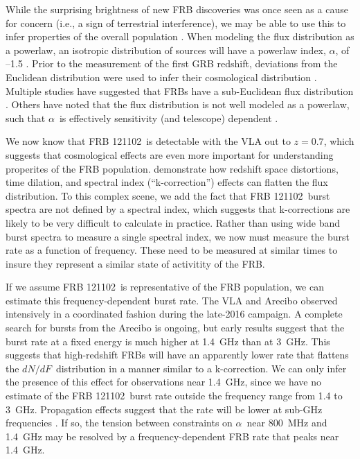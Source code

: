 \documentclass[twocolumn]{aastex61}
\newcommand{\frb}{FRB 121102}
\begin{document}
While the surprising brightness of new FRB discoveries was once seen as a cause for concern (i.e., a sign of terrestrial interference), we may be able to use this to infer properties of the overall population \citep{2007Sci...318..777L, 2016arXiv161105758R}. When modeling the flux distribution as a powerlaw, an isotropic distribution of sources will have a powerlaw index, $\alpha$, of --1.5 \citep[the ``Euclidean distribution'';][]{2016MNRAS.462..941L}. Prior to the measurement of the first GRB redshift, deviations from the Euclidean distribution were used to infer their cosmological distribution \citep[e.g., the $V/V_{\rm{max}}$\ test;][]{1992ApJ...388L..45M, 1995ApJ...453...25F}. Multiple studies have suggested that FRBs have a sub-Euclidean flux distribution \citep[$-0.5<\alpha<-0.9$;][]{2016ApJ...830...75V, 2016arXiv160206099L, 2016arXiv161100458L}. Others have noted that the flux distribution is not well modeled as a powerlaw, such that $\alpha$\ is effectively sensitivity (and telescope) dependent \citep{2016MNRAS.461..984O, 2017arXiv170208040C}.

We now know that \frb\ is detectable with the VLA out to $z=0.7$, which suggests that cosmological effects are even more important for understanding properites of the FRB population. \citet{2017arXiv170208040C} demonstrate how redshift space distortions, time dilation, and spectral index (``k-correction'') effects can flatten the flux distribution. To this complex scene, we add the fact that \frb\ burst spectra are not defined by a spectral index, which suggests that k-corrections are likely to be very difficult to calculate in practice. Rather than using wide band burst spectra to measure a single spectral index, we now must measure the burst rate as a function of frequency. These need to be measured at similar times to insure they represent a similar state of activitity of the FRB.

If we assume \frb\ is representative of the FRB population, we can estimate this frequency-dependent burst rate. The VLA and Arecibo observed intensively in a coordinated fashion during the late-2016 campaign. A complete search for bursts from the Arecibo is ongoing, but early results suggest that the burst rate at a fixed energy is much higher at 1.4~GHz than at 3~GHz. This suggests that high-redshift FRBs will have an apparently lower rate that flattens the $dN/dF$\ distribution in a manner similar to a k-correction. We can only infer the presence of this effect for observations near 1.4~GHz, since we have no estimate of the \frb\ burst rate outside the frequency range from 1.4 to 3~GHz. Propagation effects suggest that the rate will be lower at sub-GHz frequencies \citep{2017MNRAS.465.2286R}. If so, the tension between constraints on $\alpha$\ near 800~MHz and 1.4~GHz may be resolved by a frequency-dependent FRB rate that peaks near 1.4~GHz.
\end{document}

